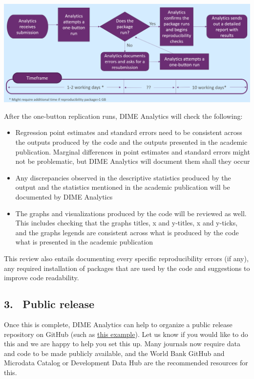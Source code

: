 \begin{fullwidth}
	\bigskip
	
	\begin{center}
		\includegraphics[width=0.9\linewidth]{../img/rep-checks-timeline.png}
	\end{center}

	\bigskip

	After the one-button replication runs, DIME Analytics will check the following:

	\bigskip

	\begin{itemize}
		\setlength\itemsep{-0.1em}
		\item{Regression point estimates and standard errors need to be consistent across the outputs produced by the code and the outputs presented in the academic publication. Marginal differences in point estimates and standard errors might not be problematic, but DIME Analytics will document them shall they occur}
		\item{Any discrepancies observed in the descriptive statistics produced by the output and the statistics mentioned in the academic publication will be documented by DIME Analytics}
		\item{The graphs and visualizations produced by the code will be reviewed as well. This includes checking that the graphs titles, x and y-titles, x and y-ticks, and the graphs legends are consistent across what is produced by the code what is presented in the academic publication}
	\end{itemize}

	\bigskip
	
	This review also entails documenting every specific reproducibility errors (if any), any required installation of packages that are used by the code and suggestions to improve code readability.

	\subsection{3. \, Public release}

	Once this is complete, DIME Analytics can help to organize a public release repository on GitHub (such as \href{https://github.com/worldbank/rio-safe-space}{this example}). Let us know if you would like to do this and we are happy to help you set this up. Many journals now require data and code to be made publicly available, and the World Bank GitHub and Microdata Catalog or Development Data Hub are the recommended resources for this.

	\end{fullwidth}

